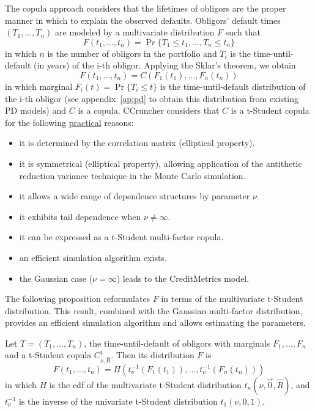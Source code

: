 \documentclass[11pt,fleqn]{book} %
\begin{document}
The copula approach considers that the lifetimes of obligors are the proper 
manner in which to explain the observed defaults. Obligors' default times 
$(T_1,\dots,T_n)$ are modeled by a multivariate distribution $F$ such that
\begin{displaymath}
	F(t_1, \dots, t_n) = \Pr \{T_1 \le t_1, \dots, T_n \le t_n\}
\end{displaymath}
in which $n$ is the number of obligors in the portfolio and $T_i$ is the 
time-until-default (in years) of the i-th obligor. Applying the Sklar's 
theorem, we obtain
\begin{displaymath}
	F(t_1, \dots, t_n) = 
	C\left(F_1(t_1), \dots, F_n(t_n)\right)
\end{displaymath}
in which marginal $F_i(t) = \Pr\{T_i \le t\}$ is the time-until-default 
distribution of the i-th obligor (see appendix~\ref{ap:pd} to obtain
this distribution from existing PD models) and $C$ is a copula. CCruncher 
considers that $C$ is a t-Student copula for the following \ul{practical} 
reasons:

\begin{itemize}
	\item it is determined by the correlation matrix (elliptical property). 
	\item it is symmetrical (elliptical property), allowing application of the 
	antithetic reduction variance technique in the Monte Carlo simulation.
	\item it allows a wide range of dependence structures by parameter $\nu$.
	\item it exhibits tail dependence when $\nu \ne \infty$.
	\item it can be expressed as a t-Student multi-factor copula.
	\item an efficient simulation algorithm exists.
	\item the Gaussian case ($\nu = \infty$) leads to the 
	CreditMetrics\texttrademark{} model.
\end{itemize}

The following proposition reformulates $F$ in terms of the multivariate 
t-Student distribution. This result, combined with the Gaussian multi-factor 
distribution, provides an efficient simulation algorithm and allows estimating
the parameters.

\begin{proposition}
	\label{prop:dtd}
	Let $T=(T_1,\dots,T_n)$, the time-until-default of obligors with marginals 
	$F_1, \dots, F_n$ and a t-Student copula $C_{\nu,\widehat{R}}^{\text{t}}$. 
	Then its distribution $F$ is
	\begin{displaymath}
		F(t_1,\dots,t_n) = 
		H\left(t_\nu^{-1}(F_1(t_1)), \dots, t_\nu^{-1}(F_n(t_n))\right)
	\end{displaymath}
	in which $H$ is the cdf of the multivariate t-Student distribution 
	$t_n(\nu,\vec{0},\widehat{R})$, and $t_\nu^{-1}$ is the inverse of the 
	univariate t-Student distribution $t_1(\nu,0,1)$.
\end{proposition}
\end{document}
